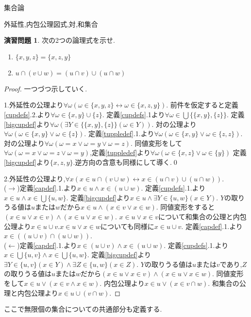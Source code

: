 \documentclass[14pt]{jsarticle}
\theoremstyle{definition}
\newtheorem{doril}[dfn]{演習問題}
\begin{document}
\begin{section}{集合論}
\begin{subsection}{外延性,内包公理図式,対,和集合}
\begin{doril}次の2つの論理式を示せ.
\begin{enumerate}
	\item $\{x,y,z\}=\{x,z,y\}$
	\item $u\cap(v\cup w) = (u\cap v)\cup(u\cap w)$
\end{enumerate}
\end{doril}
\begin{proof}
一つづつ示していく.\par
1.外延性の公理より$\forall \omega(\omega \in\{x,y,z\} \leftrightarrow \omega \in\{x,z,y\})$.
前件を仮定すると定義\ref{cupdefs}.2.より$\forall \omega \in \{x,y\}\cup \{z\}$.
定義\ref{cupdefs}.1より$\forall \omega \in \bigcup \{\{x,y\},\{z\}\}$.
定義\ref{bigcupdef}より$\forall \omega ( \exists Y \in \{\{x,y\},\{z\}\}(\omega \in Y))$.
対の公理より$\forall \omega(\omega \in \{x,y\} \lor \omega \in \{z\})$.
定義\ref{tuppledef}.1.より$\forall \omega( \omega \in \{x,y\} \lor \omega \in \{z,z\})$.
対の公理より$\forall \omega (\omega =x \lor \omega =y \lor \omega=z)$.
同値変形をして$\forall \omega(\omega =x \lor \omega =z \lor \omega =y)$,定義\ref{tuppledef}より$\forall \omega(\omega \in\{x,z\}\lor \omega \in \{y\})$
定義\ref{bigcupdef}より$\{x,z,y\}$.逆方向の含意も同様にして導く.\qed\par
2.外延性の公理より,$\forall x(x\in u\cap (v\cup w) \leftrightarrow x\in(u\cap v)\cup(u \cap w))$.\\
($\to$)定義\ref{capdef}.1.より$x\in u \land x\in (u\cup w)$.
定義\ref{cupdefs}.1.より$x\in u \land x\in \bigcup\{u,w\}$.
定義\ref{bigcupdef}より$x\in u \land \exists Y \in \{u,w\}(x \in Y)$.
$Y$の取りうる値は$u$または$w$だから$x\in u \land(x \in v \lor x \in w)$.
同値変形をすると$(x\in u \lor x\in v)\land(x\in u \lor x\in w)$.
$x\in u \lor x\in v$について和集合の公理と内包公理より$x\in u\cup v$.$x\in u \lor x\in w$についても同様に$x\in u\cup v$.
定義\ref{capdef}.1.より$x \in ((u\cup v)\cap(u\cup w))$.\\
($\leftarrow$)定義\ref{capdef}.1.より$x\in (u \cup v) \land x\in (u\cup w)$.
定義\ref{cupdefs}.1.より$x\in \bigcup\{u,v\} \land x\in \bigcup \{u,w\}$.
定義\ref{bigcupdef}より$\exists Y \in \{u,v\}(x\in Y) \land \exists Z \in \{u,w\}(x\in Z)$.
$Y$の取りうる値は$u$または$v$であり,$Z$の取りうる値は$u$または$w$だから$(x\in u \lor x\in v)\land (x\in u \lor x\in w)$.
同値変形をして$x\in u\lor(x\in v \land x\in w)$.
内包公理より$x\in u\lor(x\in v \cap w)$.
和集合の公理と内包公理より$x\in u\cup(v\cap w)$.
\end{proof}
ここで無限個の集合についての共通部分も定義する.

\end{subsection}
\end{section}
\end{document}
